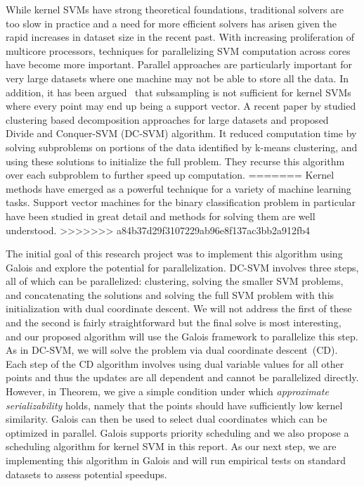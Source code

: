  
While kernel SVMs have strong theoretical foundations, traditional solvers are too slow in practice and a need for more efficient solvers has arisen given the rapid increases in dataset size in the recent past. With increasing proliferation of multicore processors, techniques for parallelizing SVM computation across cores have become more important. Parallel approaches are particularly important for very large datasets where one machine may not be able to store all the data. In addition, it has been argued~\cite{brugger2006parallel} that subsampling is not sufficient for kernel SVMs where every point may end up being a support vector. A recent paper by \cite{hsieh2013divide} studied clustering based decomposition approaches for large datasets and proposed Divide and Conquer-SVM (DC-SVM) algorithm. It reduced computation time by solving subproblems on portions of the data identified by k-means clustering, and using these solutions to initialize the full problem. They recurse this algorithm over each subproblem to further speed up computation. 
=======
Kernel methods have emerged as a powerful technique for a variety of machine learning tasks. 
Support vector machines for the binary classification problem in particular have been studied in great detail and methods for solving them are well understood. 
>>>>>>> a84b37d29f3107229ab96e8f137ac3bb2a912fb4

The initial goal of this research project was to implement this algorithm using Galois and explore the potential for parallelization. 
DC-SVM involves three steps, all of which can be parallelized: clustering, solving the smaller SVM problems, and concatenating the solutions and solving the full SVM problem with this initialization with dual coordinate descent. 
We will not address the first of these and the second is fairly straightforward but the final solve is most interesting, and our proposed algorithm will use the Galois framework to parallelize this step. As in DC-SVM, we will solve the problem via dual coordinate descent~(CD). Each step of the CD algorithm involves using dual variable values for all other points and thus the updates are all dependent and cannot be parallelized directly. However, in Theorem, we give a simple condition under which \emph{approximate serializability} holds, namely that the points should have sufficiently low kernel similarity. Galois can then be used to select dual coordinates which can be optimized in parallel. Galois supports priority scheduling and we also propose a scheduling algorithm for kernel SVM in this report. As our next step, we are implementing this algorithm in Galois and will run empirical tests on standard datasets to assess potential speedups.

